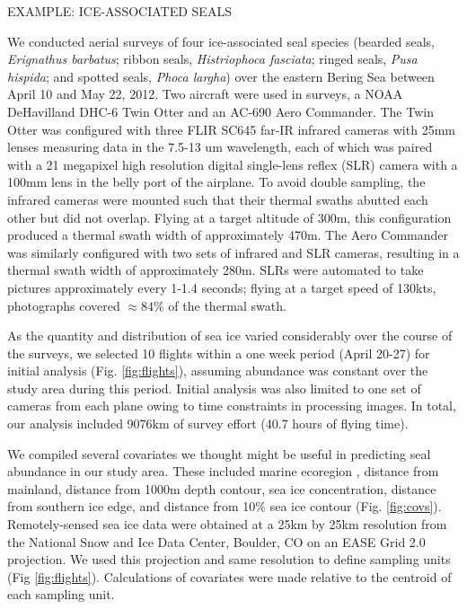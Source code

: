 \documentclass[12pt,fleqn]{article}
\begin{document}
\begin{flushleft}
\vspace{.15in}
EXAMPLE: ICE-ASSOCIATED SEALS\\
\vspace{.15in}

We conducted aerial surveys of four ice-associated seal species (bearded seals, {\it Erignathus barbatus}; ribbon seals, {\it Histriophoca fasciata}; ringed seals, {\it Pusa hispida}; and spotted seals, {\it Phoca largha}) over the eastern Bering Sea between April 10 and May 22, 2012.  Two aircraft were used in surveys, a NOAA DeHavilland DHC-6 Twin Otter and an AC-690 Aero Commander.  The Twin Otter was configured with three FLIR SC645 far-IR infrared cameras with 25mm lenses measuring data in the 7.5-13 um wavelength, each of which was paired with a 21 megapixel high resolution digital single-lens reflex (SLR) camera with a 100mm lens in the belly port of the airplane.  To avoid double sampling, the infrared cameras were mounted such that their thermal swaths abutted each other but did not overlap.  Flying at a target altitude of 300m, this configuration produced a thermal swath width of approximately 470m.  The Aero Commander was similarly configured with two sets of infrared and SLR cameras, resulting in a thermal swath width of approximately 280m. SLRs were automated to take pictures approximately every 1-1.4 seconds; flying at a target speed of 130kts, photographs covered $\approx 84\%$ of the thermal swath.

\hspace{.5in}As the quantity and distribution of sea ice varied considerably over the course of the surveys, we selected 10 flights within a one week period (April 20-27) for initial analysis (Fig. \ref{fig:flights}), assuming abundance was constant over the study area during this period.  Initial analysis was also limited to one set of cameras from each plane owing to time constraints in processing images.  In total, our analysis included 9076km of survey effort (40.7 hours of flying time).

\hspace{.5in}We compiled several covariates we thought might be useful in predicting seal abundance in our study area. These included marine ecoregion \citep[cf.][]{PiattSpringer2007}, distance from mainland, distance from 1000m depth contour, sea ice concentration, distance from southern ice edge, and distance from 10\% sea ice contour (Fig. \ref{fig:covs}).  Remotely-sensed sea ice data were obtained at a 25km by 25km resolution from the National Snow and Ice Data Center, Boulder, CO on an EASE Grid 2.0 projection.  We used this projection and same resolution to define sampling units (Fig \ref{fig:flights}). Calculations of covariates were made relative to the centroid of each sampling unit.


\end{flushleft}
\end{document}
